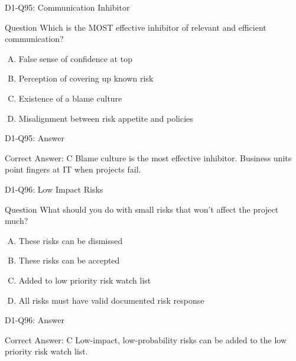 \documentclass{beamer}
\begin{document}
	\begin{frame}{D1-Q95: Communication Inhibitor}
		\begin{block}{Question}
			Which is the MOST effective inhibitor of relevant and efficient communication?
		\end{block}
		\begin{enumerate}[(A)]
			\item False sense of confidence at top
			\item Perception of covering up known risk
			\item Existence of a blame culture
			\item Misalignment between risk appetite and policies
		\end{enumerate}
	\end{frame}
	\begin{frame}{D1-Q95: Answer}
		\begin{block}{Correct Answer: C}
			Blame culture is the most effective inhibitor. Business units point fingers at IT when projects fail.
		\end{block}
	\end{frame}
	
	\begin{frame}{D1-Q96: Low Impact Risks}
		\begin{block}{Question}
			What should you do with small risks that won't affect the project much?
		\end{block}
		\begin{enumerate}[(A)]
			\item These risks can be dismissed
			\item These risks can be accepted
			\item Added to low priority risk watch list
			\item All risks must have valid documented risk response
		\end{enumerate}
	\end{frame}
	\begin{frame}{D1-Q96: Answer}
		\begin{block}{Correct Answer: C}
			Low-impact, low-probability risks can be added to the low priority risk watch list.
		\end{block}
	\end{frame}
	
\end{document}
